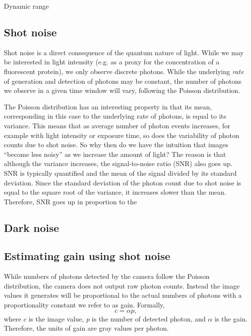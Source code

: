 \documentclass[a4paper]{report}
\begin{document}
Dynamic range
\subsection{Shot noise}
Shot noise is a direct consequence of the quantum nature of light. While we may be interested in light intensity (e.g. as a proxy for the concentration of a fluorescent protein), we only observe discrete photons. 
While the underlying \textit{rate} of generation and detection of photons may be constant, the number of photons we observe in a given time window will vary, following the Poisson distribution.

The Poisson distribution has an interesting property in that its mean, corresponding in this case to the underlying rate of photons, is equal to its variance.
This means that as average number of photon events increases, for example with light intensity or exposure time, so does the variability of photon counts due to shot noise.
So why then do we have the intuition that images ``become less noisy'' as we increase the amount of light? 
The reason is that although the variance increases, the signal-to-noise ratio (SNR) also goes up. 
SNR is typically quantified and the mean of the signal divided by its standard deviation. 
Since the standard deviation of the photon count due to shot noise is equal to the square root of the variance, it increases slower than the mean. 
Therefore, SNR goes up in proportion to the

\subsection{Dark noise}

\subsection{Estimating gain using shot noise}
While numbers of photons detected by the camera follow the Poisson distribution, the camera does not output raw photon counts.
Instead the image values it generates will be proportional to the actual numbers of photons with a proportionality constant we refer to as gain.
Formally,
\begin{equation}
	c = \alpha p,
\end{equation} 
where $c$ is the image value, $p$ is the number of detected photon, and $\alpha$ is the gain.
Therefore, the units of gain are gray values per photon. 
\end{document}

